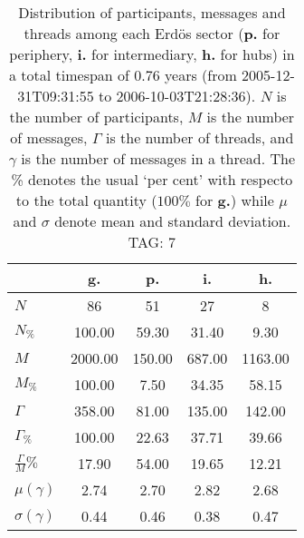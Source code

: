 \begin{table}[h!]
\begin{center}
\begin{tabular}{| l || c | c | c | c |}\hline
 & {\bf g.} & {\bf p.} & {\bf i.} & {\bf h.} \\\hline\hline
$N$ & 86  & 51  & 27  & 8 \\
$N_{\%}$ & 100.00  & 59.30  & 31.40  & 9.30 \\\hline
$M$ & 2000.00  & 150.00  & 687.00  & 1163.00 \\
$M_{\%}$ & 100.00  & 7.50  & 34.35  & 58.15 \\\hline
$\Gamma$ & 358.00  & 81.00  & 135.00  & 142.00 \\
$\Gamma_{\%}$ & 100.00  & 22.63  & 37.71  & 39.66 \\\hline
$\frac{\Gamma}{M}\%$ & 17.90  & 54.00  & 19.65  & 12.21 \\
$\mu(\gamma)$ & 2.74  & 2.70  & 2.82  & 2.68 \\
$\sigma(\gamma)$ & 0.44  & 0.46  & 0.38  & 0.47 \\\hline
\end{tabular}
\caption{Distribution of participants, messages and threads among each Erd\"os sector ({\bf p.} for periphery, {\bf i.} for intermediary, 
    {\bf h.} for hubs) in a total timespan of 0.76 years (from 2005-12-31T09:31:55 to 2006-10-03T21:28:36). $N$ is the number of participants, $M$ is the number of messages, $\Gamma$ is the number of threads, and $\gamma$ is the number of messages in a thread.
    The \% denotes the usual `per cent' with respecto to the total quantity ($100\%$ for {\bf g.})
    while $\mu$ and $\sigma$ denote mean and standard deviation. TAG: 7}
\end{center}
\end{table}